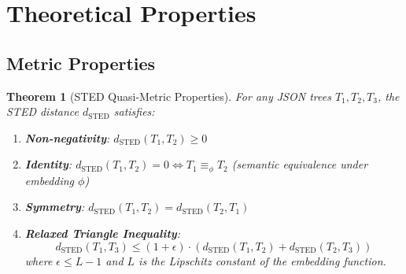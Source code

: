 \documentclass{article}
\newtheorem{theorem}{Theorem}
\begin{document}
\section{Theoretical Properties}

\subsection{Metric Properties}

\begin{theorem}[STED Quasi-Metric Properties]
\label{thm:metric}
For any JSON trees $T_1, T_2, T_3$, the STED distance $d_{\text{STED}}$ satisfies:
\begin{enumerate}
    \item[(i)] \textbf{Non-negativity}: $d_{\text{STED}}(T_1, T_2) \geq 0$
    \item[(ii)] \textbf{Identity}: $d_{\text{STED}}(T_1, T_2) = 0 \Leftrightarrow T_1 \equiv_{\phi} T_2$ (semantic equivalence under embedding $\phi$)
    \item[(iii)] \textbf{Symmetry}: $d_{\text{STED}}(T_1, T_2) = d_{\text{STED}}(T_2, T_1)$
    \item[(iv)] \textbf{Relaxed Triangle Inequality}:
    \begin{equation}
        d_{\text{STED}}(T_1, T_3) \leq (1 + \epsilon) \cdot \left(d_{\text{STED}}(T_1, T_2) + d_{\text{STED}}(T_2, T_3)\right)
    \end{equation}
    where $\epsilon \leq L - 1$ and $L$ is the Lipschitz constant of the embedding function.
\end{enumerate}
\end{theorem}
\end{document}
